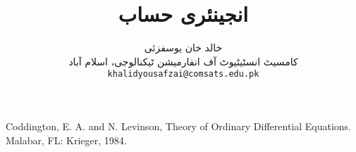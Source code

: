 \documentclass[leqno,b5paper]{book}
\author{
خالد خان یوسفزئی\\
{\small {کامسیٹ انسٹیٹیوٹ آف انفارمیشن ٹیکنالوجی، اسلام آباد}}\\
\texttt{khalidyousafzai@comsats.edu.pk}
}
\title{انجینئری حساب}
\date{}                           %
\begin{document}
\begin{urdufont}


\renewcommand*{\contentsname}{عنوان}    %
\renewcommand*{\proofname}{ثبوت}   %
\renewcommand*{\appendixname}{ضمیمہ}


\frontmatter                          %

\maketitle

\tableofcontents
\pagestyle{empty}
\newpage

\newpage

%


\mainmatter                      %
\renewcommand*{\chaptername}{باب}

\pagestyle{headings}










\renewcommand*{\bibname}{حوالہ}      %
\begin{thebibliography}{99}\label{حوالہ_بیرونی_مواد}
\begin{otherlanguage}{english}
 Coddington, E. A. and N. Levinson, Theory of
Ordinary Differential Equations. Malabar, FL: Krieger,
1984.

\end{otherlanguage}
\end{thebibliography}
\appendix

%

%
%
%
\backmatter

\cleardoublepage
%
%



\renewcommand*{\indexname}{فرہنگ}      %
\cleardoublepage
{}


\end{urdufont}
\end{document}
